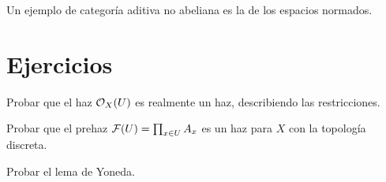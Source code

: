 \documentclass[GA.tex]{subfiles}
\begin{document}
Un ejemplo de categoría aditiva no abeliana es la de los espacios normados.

\section{Ejercicios}
\begin{ejer}
Probar que el haz ${\mathcal O}_X(U)$ es realmente un haz, describiendo las restricciones. 
\end{ejer}
\begin{ejer}
Probar que el prehaz $\mathcal{F}(U)=\prod_{x\in U} A_x$ es un haz para $X$ con la topología discreta. 
\end{ejer}
\begin{ejer}
Probar el lema de Yoneda. 
\end{ejer}
\end{document}
